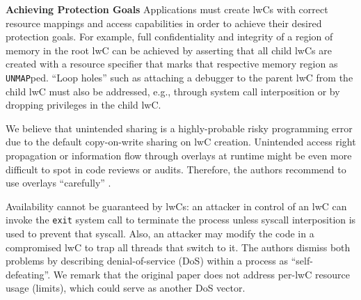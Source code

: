 \documentclass[10pt,twocolumn,a4paper]{article}
\begin{document}
\textbf{Achieving Protection Goals}\hspace{1em}
Applications must create lwCs with correct resource mappings and access capabilities in order to achieve their desired protection goals.
For example, full confidentiality and integrity of a region of memory in the root lwC can be achieved by asserting that all child lwCs are created with a resource specifier that marks that respective memory region as \lstinline{UNMAP}ped.
\enquote{Loop holes} such as attaching a debugger to the parent lwC from the child lwC must also be addressed, e.g., through system call interposition or by dropping privileges in the child lwC.

We believe that unintended sharing is a highly-probable risky programming error due to the default copy-on-write sharing on lwC creation.
Unintended access right propagation or information flow through overlays at runtime might be even more difficult to spot in code reviews or audits.
Therefore, the authors recommend to use overlays \enquote{carefully} \cite{lwcpaper}.

Availability cannot be guaranteed by lwCs:
an attacker in control of an lwC can invoke the \lstinline{exit} system call to terminate the process unless syscall interposition is used to prevent that syscall.
Also, an attacker may modify the code in a compromised lwC to trap all threads that switch to it.
The authors dismiss both problems by describing denial-of-service (DoS) within a process as \enquote{self-defeating}.
\cite{lwcpaper}
We remark that the original paper does not address per-lwC resource usage (limits), which could serve as another DoS vector. 




\end{document}
